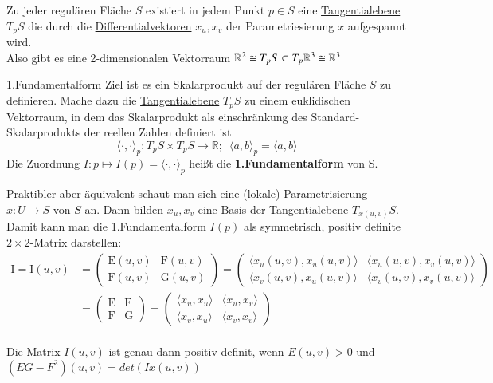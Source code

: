 \begin{rawDef}
Zu jeder regulären Fläche $S$ existiert in jedem Punkt $p\in S$ eine \hyperref[tangentialebene]{Tangentialebene} $T_pS$ die durch die \hyperref[differenzial]{Differentialvektoren} $x_u,x_v$ der Parametriesierung $x$ aufgespannt wird.\\
Also gibt es eine 2-dimensionalen Vektorraum $\mathbb{R}^2\cong T_pS\subset T_p\mathbb{R}^3\cong\mathbb{R}^3$
\end{rawDef}

\begin{titleDef}{1.Fundamentalform}
\label{fundamentalformEins}
Ziel ist es ein Skalarprodukt auf der regulären Fläche $S$ zu definieren. Mache dazu die \hyperref[tangentialebene]{Tangentialebene} $T_pS$ zu einem euklidischen Vektorraum, in dem das Skalarprodukt als einschränkung des Standard-Skalarprodukts der reellen Zahlen definiert ist
$$\langle \cdot,\cdot\rangle_p:T_pS\times T_pS\to\mathbb{R};\;\: \langle a,b\rangle_p=\langle a,b\rangle$$
Die Zuordnung $I:p\mapsto I(p)=\langle \cdot,\cdot\rangle_p$ heißt die \textbf{1.Fundamentalform} von S.\par
Praktibler aber äquivalent schaut man sich eine (lokale) Parametrisierung $x:U\to S$ von $S$ an. Dann bilden $x_u,x_v$ eine Basis der \hyperref[tangentialebene]{Tangentialebene} $T_{x(u,v)}S$. Damit kann man die 1.Fundamentalform $I(p)$ als symmetrisch, positiv definite $2\times 2$-Matrix darstellen:
\begin{align*}
	\mathrm{I}=\mathrm{I}(u,v) &= 
	\begin{pmatrix} 
		\mathrm{E}(u,v) & \mathrm{F}(u,v)\\
		\mathrm{F}(u,v) & \mathrm{G}(u,v)
	\end{pmatrix} = 
	\begin{pmatrix} 
		\langle x_u(u,v),x_u(u,v)\rangle & \langle x_u(u,v),x_v(u,v)\rangle\\
		\langle x_v(u,v),x_u(u,v)\rangle & \langle x_v(u,v),x_v(u,v)\rangle
	\end{pmatrix} 
	\\
	&= \begin{pmatrix} 
		\mathrm{E} & \mathrm{F}\\
		\mathrm{F} & \mathrm{G}
	\end{pmatrix} =
	\begin{pmatrix} 
		\langle x_u,x_u\rangle & \langle x_u,x_v\rangle\\
		\langle x_v,x_u\rangle & \langle x_v,x_v\rangle
	\end{pmatrix}
\end{align*}\\
Die Matrix $I(u,v)$ ist genau dann positiv definit, wenn $E(u,v)>0$ und\\ ${(EG-F^2)(u,v)=det(Ix(u,v))}$
\end{titleDef}

